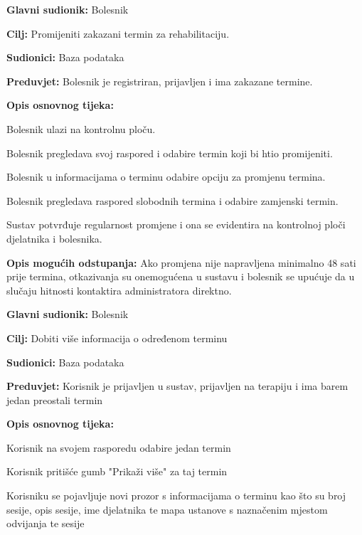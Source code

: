 \documentclass[12pt]{report}
\newenvironment{packed_enum}{
	\begin{enumerate}
		\setlength{\itemsep}{0pt}
		\setlength{\parskip}{0pt}
		\setlength{\parsep}{0pt}
	}{\end{enumerate}}
\begin{document}
	\item \textbf{Glavni sudionik:} Bolesnik
	\item \textbf{Cilj:} Promijeniti zakazani termin za rehabilitaciju.
	\item \textbf{Sudionici:} Baza podataka
	\item \textbf{Preduvjet:} Bolesnik je registriran, prijavljen i ima zakazane termine.
	\item \textbf{Opis osnovnog tijeka:}
	\begin{packed_enum}
        	\item Bolesnik ulazi na kontrolnu ploču.
	 	\item Bolesnik pregledava svoj raspored i odabire termin koji bi htio promijeniti.
		\item Bolesnik u informacijama o terminu odabire opciju za promjenu termina.
		\item Bolesnik pregledava raspored slobodnih termina i odabire zamjenski termin.
		\item Sustav potvrđuje regularnost promjene i ona se evidentira na kontrolnoj ploči djelatnika i bolesnika. 
	\end{packed_enum}
    	\item \textbf{Opis mogućih odstupanja:}
		Ako promjena nije napravljena minimalno 48 sati prije termina, otkazivanja su onemogućena u sustavu i bolesnik se upućuje da u slučaju hitnosti kontaktira administratora direktno. 
\closeusecase


	\item \textbf{Glavni sudionik:} Bolesnik
 	\item \textbf{Cilj:} Dobiti više informacija o određenom terminu
  	\item \textbf{Sudionici:} Baza podataka
   	\item \textbf{Preduvjet:} Korisnik je prijavljen u sustav, prijavljen na terapiju i ima barem jedan preostali termin
    	\item \textbf{Opis osnovnog tijeka:}
     	\begin{packed_enum}
      		\item Korisnik na svojem rasporedu odabire jedan termin
		\item Korisnik pritišće gumb "Prikaži više" za taj termin
  		\item Korisniku se pojavljuje novi prozor s informacijama o terminu kao što su broj sesije, opis sesije, ime djelatnika te mapa ustanove s naznačenim mjestom odvijanja te sesije
    	\end{packed_enum}
\closeusecase
\end{document}
